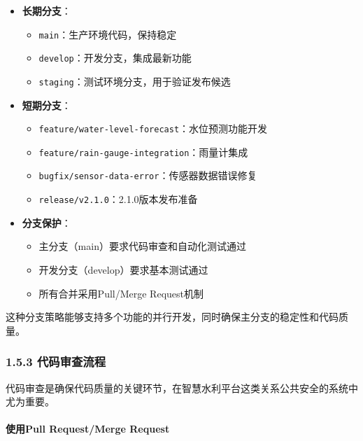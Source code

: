 \begin{itemize}
\tightlist
\item
  \textbf{长期分支}：

  \begin{itemize}
  \tightlist
  \item
    \passthrough{\lstinline!main!}：生产环境代码，保持稳定
  \item
    \passthrough{\lstinline!develop!}：开发分支，集成最新功能
  \item
    \passthrough{\lstinline!staging!}：测试环境分支，用于验证发布候选
  \end{itemize}
\item
  \textbf{短期分支}：

  \begin{itemize}
  \tightlist
  \item
    \passthrough{\lstinline!feature/water-level-forecast!}：水位预测功能开发
  \item
    \passthrough{\lstinline!feature/rain-gauge-integration!}：雨量计集成
  \item
    \passthrough{\lstinline!bugfix/sensor-data-error!}：传感器数据错误修复
  \item
    \passthrough{\lstinline!release/v2.1.0!}：2.1.0版本发布准备
  \end{itemize}
\item
  \textbf{分支保护}：

  \begin{itemize}
  \tightlist
  \item
    主分支（main）要求代码审查和自动化测试通过
  \item
    开发分支（develop）要求基本测试通过
  \item
    所有合并采用Pull/Merge Request机制
  \end{itemize}
\end{itemize}

这种分支策略能够支持多个功能的并行开发，同时确保主分支的稳定性和代码质量。

\subsubsection{1.5.3
代码审查流程}\label{ux4ee3ux7801ux5ba1ux67e5ux6d41ux7a0b}

代码审查是确保代码质量的关键环节，在智慧水利平台这类关系公共安全的系统中尤为重要。

\paragraph{使用Pull Request/Merge
Request}\label{ux4f7fux7528pull-requestmerge-request}

